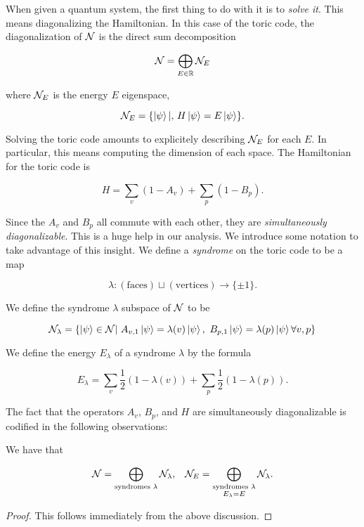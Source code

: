 When given a quantum system, the first thing to do with it is to \textit{solve it}. This means diagonalizing the Hamiltonian. In this case of the toric code, the diagonalization of $\mathcal{N}$ is the direct sum decomposition

$$\mathcal{N} = \bigoplus_{E\in \mathbb{R}}\mathcal{N}_{E}$$

where $\mathcal{N}_{E}$ is the energy $E$ eigenspace,

$$\mathcal{N}_{E}=\{\ket{\psi} | ,\, H\ket{\psi}= E \ket{\psi}\}.$$

Solving the toric code amounts to explicitely describing $\mathcal{N}_E$ for each $E$. In particular, this means computing the dimension of each space. The Hamiltonian for the toric code is 

$$H=\sum_{v}(1-A_v)+\sum_{p}(1-B_p).$$

Since the $A_v$ and $B_p$ all commute with each other, they are \textit{simultaneously diagonalizable}. This is a huge help in our analysis. We introduce some notation to take advantage of this insight. We define a \textit{syndrome} on the toric code to be a map

$$\lambda: (\text{faces})\sqcup (\text{vertices})\xrightarrow{}\{\pm 1\}.$$

We define the syndrome $\lambda$ subspace of $\mathcal{N}$ to be

$$\mathcal{N}_{\lambda}=\{\ket{\psi}\in \mathcal{N} | \,\, A_{v,1}\ket{\psi}=\lambda(v)\ket{\psi},\,\, B_{p,1}\ket{\psi}=\lambda(p)\ket{\psi}    \forall v,p\}$$

We define the energy $E_{\lambda}$ of a syndrome $\lambda$ by the formula

$$E_{\lambda}=\sum_{v}\frac{1}{2}(1-\lambda(v))+\sum_{p}\frac{1}{2}(1-\lambda(p)).$$

The fact that the operators $A_v$, $B_p$, and $H$ are simultaneously diagonalizable is codified in the following observations:

\begin{proposition} We have that

\begin{align*}
\mathcal{N} = \bigoplus_{\text{syndromes $\lambda$}} \mathcal{N}_{\lambda}, && \mathcal{N}_{E}=\bigoplus_{\substack{\text{syndromes $\lambda$}  \\ E_\lambda = E }  } \mathcal{N}_{\lambda}.
\end{align*}

\end{proposition}
\begin{proof} This follows immediately from the above discussion.
\end{proof}


